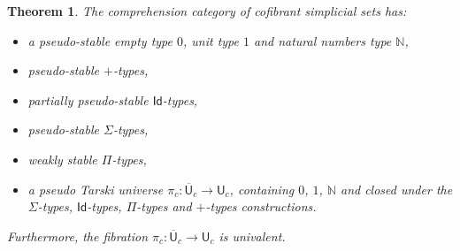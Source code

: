 \documentclass[reqno,10pt,a4paper,oneside]{amsart}
\numberwithin{equation}{section}
\theoremstyle{mythm}
\newtheorem{theorem}{Theorem}[section]
\theoremstyle{mydef}
\theoremstyle{myrmk}
\newcommand{\UU}{\overline{\mathsf{U}}}
\newcommand{\U}{\mathsf{U}}
\newcommand{\Id}{\mathsf{Id}}
\begin{document}
\begin{theorem} \label{th:main_ContextualCat} The comprehension category of cofibrant simplicial sets has:
\begin{itemize}
\item a pseudo-stable empty type $0$, unit type $1$ and natural numbers type $\mathbb{N}$,
\item pseudo-stable $+$-types,
\item partially pseudo-stable $\Id$-types,
\item pseudo-stable $\Sigma$-types,
\item weakly stable $\Pi$-types,
\item a pseudo Tarski universe $\pi_c: \UU_c \rightarrow \U_c$, containing $0$, $1$, $\mathbb{N}$ and closed under the $\Sigma$-types, $\Id$-types, $\Pi$-types and $+$-types constructions.
\end{itemize}
Furthermore, the fibration $\pi_c: \UU_c \rightarrow \U_c $ is univalent.
\end{theorem}
\end{document}
